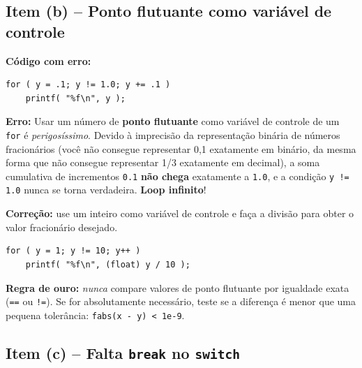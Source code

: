 \documentclass[12pt,a4paper]{article}
\begin{document}
\subsection*{Item (b) -- Ponto flutuante como variável de controle}

\begin{respostabox}
\textbf{Código com erro:}
\begin{lstlisting}
for ( y = .1; y != 1.0; y += .1 )
    printf( "%f\n", y );
\end{lstlisting}

\textbf{Erro:} Usar um número de \textbf{ponto flutuante} como variável de controle de
um \texttt{for} é \textit{perigosíssimo}. Devido à imprecisão da representação binária
de números fracionários (você não consegue representar 0,1 exatamente em binário, da
mesma forma que não consegue representar 1/3 exatamente em decimal), a soma cumulativa
de incrementos \texttt{0.1} \textbf{não chega} exatamente a \texttt{1.0}, e a condição
\texttt{y != 1.0} nunca se torna verdadeira. \textbf{Loop infinito}!

\textbf{Correção:} use um inteiro como variável de controle e faça a divisão
para obter o valor fracionário desejado.
\begin{lstlisting}
for ( y = 1; y != 10; y++ )
    printf( "%f\n", (float) y / 10 );
\end{lstlisting}

\begin{prev}
  \textbf{Regra de ouro:} \textit{nunca} compare valores de ponto flutuante por
  igualdade exata (\texttt{==} ou \texttt{!=}). Se for absolutamente necessário,
  teste se a diferença é menor que uma pequena tolerância:
  \texttt{fabs(x - y) < 1e-9}.
\end{prev}
\end{respostabox}

\subsection*{Item (c) -- Falta \texttt{break} no \texttt{switch}}
\end{document}
